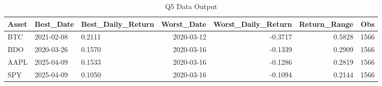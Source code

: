 \begin{table}[H]
\centering
\caption{Q5 Data Output}
\label{tab:q5}
\begin{tabular}{lllrrrr}
\toprule
Asset & Best\_Date & Best\_Daily\_Return & Worst\_Date & Worst\_Daily\_Return & Return\_Range & Obs \\
\midrule
BTC & 2021-02-08 & 0.2111 & 2020-03-12 & -0.3717 & 0.5828 & 1566 \\
BDO & 2020-03-26 & 0.1570 & 2020-03-16 & -0.1339 & 0.2909 & 1566 \\
AAPL & 2025-04-09 & 0.1533 & 2020-03-16 & -0.1286 & 0.2819 & 1566 \\
SPY & 2025-04-09 & 0.1050 & 2020-03-16 & -0.1094 & 0.2144 & 1566 \\
\bottomrule
\end{tabular}
\end{table}
